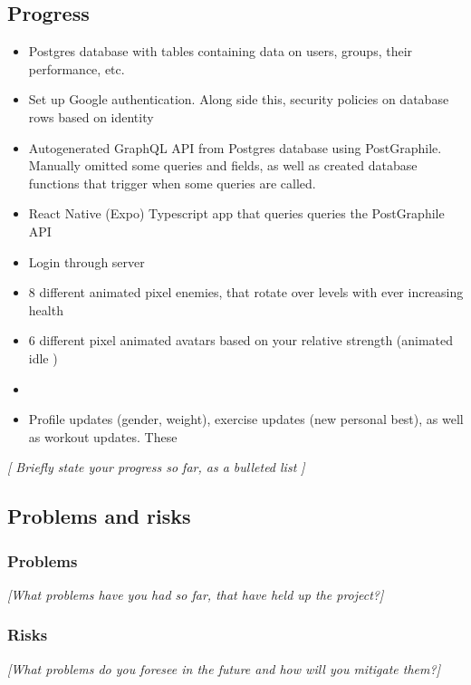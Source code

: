 \documentclass[11pt]{article}
\begin{document}
\subsection{Progress}\label{progress}
\begin{itemize}
\tightlist
\item Postgres database with tables containing data on users, groups, their performance, etc.
\item Set up Google authentication. Along side this, security policies on database rows based on identity 
\item Autogenerated GraphQL API from Postgres database using PostGraphile. Manually omitted some queries and fields, as well as created database functions that trigger when some queries are called. 
\item React Native (Expo) Typescript app that queries queries the PostGraphile API
\item Login through server
\item 8 different animated pixel enemies, that rotate over levels with ever increasing health
\item 6 different pixel animated avatars based on your relative strength (animated idle )
\item
\item Profile updates (gender, weight), exercise updates (new personal best), as well as workout updates. These 

\end{itemize}

\emph{{[}
    Briefly state your progress so far, as a bulleted list
    {]}}
\subsection{Problems and risks}\label{problems-and-risks}

\subsubsection{Problems}\label{problems}

\emph{{[}What problems have you had so far, that have held up the
project?{]}}

\subsubsection{Risks}\label{risks}

\emph{{[}What problems do you foresee in the future and how will you
mitigate them?{]}}
\end{document}
